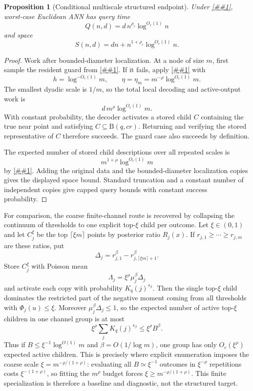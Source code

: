 \documentclass[10pt]{article}
\newcommand{\cref}[1]{\ref{##1}}
\newtheorem{proposition}[theorem]{Proposition}
\theoremstyle{definition}
\newcommand{\Ball}{\mathrm{B}}
\begin{document}
\begin{proposition}[Conditional multiscale structured endpoint]\label{prop:multiscale-structured-polylog}
   Under \cref{asm:multiscale-structured-likelihood}, worst-case Euclidean ANN has query time
   \[
      Q(n,d)=d\,n^{\rho_c}\log^{O_c(1)}n
   \]
   and space
   \[
      S(n,d)=dn+n^{1+\rho_c}\log^{O_c(1)}n.
   \]
\end{proposition}

\begin{proof}
   Work after bounded-diameter localization. At a node of size $m$, first sample the resident guard from \cref{asm:multiscale-structured-likelihood}. If it fails, apply \cref{lem:dyadic-structured-amplification} with
   \[
      h=\log^{-O_c(1)}m,
      \qquad
      \eta=\eta_m=m^{-\rho}\log^{O_c(1)}m.
   \]
   The smallest dyadic scale is $1/m$, so the total local decoding and active-output work is
   \[
      d\,m^\rho\log^{O_c(1)}m.
   \]
   With constant probability, the decoder activates a stored child $C$ containing the true near point and satisfying $C\subseteq\Ball(q,cr)$. Returning and verifying the stored representative of $C$ therefore succeeds. The guard case also succeeds by definition.

   The expected number of stored child descriptions over all repeated scales is
   \[
      m^{1+\rho}\log^{O_c(1)}m
   \]
   by \cref{lem:dyadic-structured-amplification}. Adding the original data and the bounded-diameter localization copies gives the displayed space bound. Standard truncation and a constant number of independent copies give capped query bounds with constant success probability.
\end{proof}

For comparison, the coarse finite-channel route is recovered by collapsing the continuum of thresholds to one explicit top-$\xi$ child per outcome. Let $\xi\in(0,1)$ and let $C_j^\xi$ be the top $\lceil \xi m\rceil$ points by posterior ratio $R_j(x)$. If $r_{j,1}\ge\cdots\ge r_{j,m}$ are these ratios, put
\[
   \Delta_j=r_{j,1}^{\beta}-r_{j,\lceil\xi m\rceil+1}^{\beta}.
\]
Store $C_j^\xi$ with Poisson mean
\[
   \Lambda_j=\xi^\rho\mu_j^\beta\Delta_j
\]
and activate each copy with probability $K_q(j)^{s_\beta}$. Then the single top-$\xi$ child dominates the restricted part of the negative moment coming from all thresholds with $\Phi_j(u)\le\xi$. Moreover $\mu_j^\beta\Delta_j\le1$, so the expected number of active top-$\xi$ children in one channel group is at most
\[
   \xi^\rho\sum_jK_q(j)^{s_\beta}
   \le
   \xi^\rho B^\beta .
\]
Thus if $B\le\xi^{-1}\log^{O(1)}m$ and $\beta=O(1/\log m)$, one group has only $O_c(\xi^\rho)$ expected active children. This is precisely where explicit enumeration imposes the coarse scale $\xi=m^{-\rho/(1+\rho)}$: evaluating all $B\simeq\xi^{-1}$ outcomes in $\xi^{-\rho}$ repetitions costs $\xi^{-(1+\rho)}$, so fitting the $m^\rho$ budget forces $\xi\ge m^{-\rho/(1+\rho)}$. This finite specialization is therefore a baseline and diagnostic, not the structured target.
\end{document}

